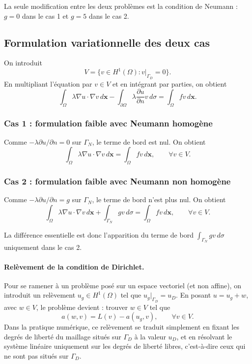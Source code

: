 \documentclass[12pt,a4paper]{article}
\begin{document}
	La seule modification entre les deux problèmes est la condition de Neumann : $g=0$ dans le cas 1 et $g=5$ dans le cas 2.
	\subsection{Formulation variationnelle des deux cas}
	\label{sec:formulation-faible}
	On introduit
	\[
	V=\{v\in H^1(\Omega):v|_{\Gamma_D}=0\}.
	\]
	En multipliant l'équation par $v\in V$ et en intégrant par parties, on obtient
	\[
	\int_\Omega \lambda\nabla u\cdot\nabla v\,d\mathbf{x}
	-\int_{\partial\Omega}\lambda\frac{\partial u}{\partial n}v\,d\sigma
	=\int_\Omega fv\,d\mathbf{x}.
	\]
	
	\subsubsection{Cas 1 : formulation faible avec Neumann homogène}
	Comme $-\lambda\partial u/\partial n=0$ sur $\Gamma_N$, le terme de bord est nul. On obtient
	\begin{equation}
		\label{eq:faible-cas1}
		\int_\Omega \lambda\nabla u\cdot\nabla v\,d\mathbf{x}
		=\int_\Omega fv\,d\mathbf{x},\qquad\forall v\in V.
	\end{equation}
	
	\subsubsection{Cas 2 : formulation faible avec Neumann non homogène}
	Comme $-\lambda\partial u/\partial n=g$ sur $\Gamma_N$, le terme de bord n'est plus nul. On obtient
	\begin{equation}
		\label{eq:variationnelle}
		\int_\Omega \lambda\nabla u\cdot\nabla v\,d\mathbf{x}
		+\int_{\Gamma_N}gv\,d\sigma
		=\int_\Omega fv\,d\mathbf{x},\qquad\forall v\in V.
	\end{equation}
	
	La différence essentielle est donc l'apparition du terme de bord $\int_{\Gamma_N}gv\,d\sigma$ uniquement dans le cas 2.
	\paragraph{Relèvement de la condition de Dirichlet.}
	Pour se ramener à un problème posé sur un espace vectoriel (et non affine), on introduit un relèvement $u_g \in H^1(\Omega)$ tel que $u_g|_{\Gamma_D} = u_D$. En posant $u = u_g + w$, avec $w \in V$, le problème devient : trouver $w \in V$ tel que
	\[
	a(w,v) = L(v) - a(u_g, v), \qquad \forall v \in V.
	\]
	Dans la pratique numérique, ce relèvement se traduit simplement en fixant les degrés de liberté du maillage situés sur $\Gamma_D$ à la valeur $u_D$, et en résolvant le système linéaire uniquement sur les degrés de liberté libres, c'est-à-dire ceux qui ne sont pas situés sur $\Gamma_D$.
	
\end{document}

